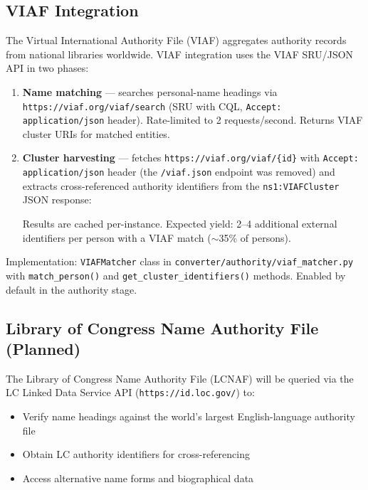 \documentclass[12pt]{article}
\newcommand{\filepath}[1]{\texttt{\small #1}}
\newcommand{\code}[1]{\texttt{#1}}
\begin{document}
\subsection{VIAF Integration}

The Virtual International Authority File (VIAF) aggregates authority records from national libraries worldwide. VIAF integration uses the VIAF SRU/JSON API in two phases:

\begin{enumerate}
\item \textbf{Name matching} --- searches personal-name headings via \code{https://viaf.org/viaf/search} (SRU with CQL, \code{Accept: application/json} header). Rate-limited to 2 requests/second. Returns VIAF cluster URIs for matched entities.
\item \textbf{Cluster harvesting} --- fetches \code{https://viaf.org/viaf/\{id\}} with \code{Accept: application/json} header (the \code{/viaf.json} endpoint was removed) and extracts cross-referenced authority identifiers from the \code{ns1:VIAFCluster} JSON response:
  Results are cached per-instance. Expected yield: 2--4 additional external identifiers per person with a VIAF match ($\sim$35\% of persons).
\end{enumerate}

Implementation: \code{VIAFMatcher} class in \filepath{converter/authority/viaf\_matcher.py} with \code{match\_person()} and \code{get\_cluster\_identifiers()} methods. Enabled by default in the authority stage.

\subsection{Library of Congress Name Authority File (Planned)}

The Library of Congress Name Authority File (LCNAF) will be queried via the LC Linked Data Service API (\code{https://id.loc.gov/}) to:

\begin{itemize}
\item Verify name headings against the world's largest English-language authority file
\item Obtain LC authority identifiers for cross-referencing
\item Access alternative name forms and biographical data
\end{itemize}
\end{document}
